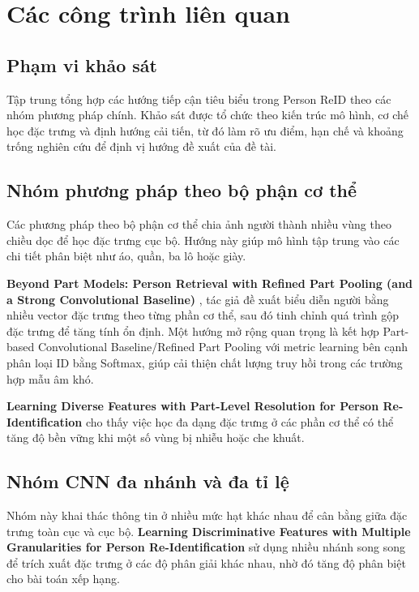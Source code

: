 \section{Các công trình liên quan}

\subsection{Phạm vi khảo sát}
Tập trung tổng hợp các hướng tiếp cận tiêu biểu trong Person
ReID theo các nhóm phương pháp chính. Khảo sát được tổ chức
theo kiến trúc mô hình, cơ chế học đặc trưng và định hướng cải tiến, từ đó làm
rõ ưu điểm, hạn chế và khoảng trống nghiên cứu để định vị hướng đề xuất của đề
tài.

\subsection{Nhóm phương pháp theo bộ phận cơ thể}
Các phương pháp theo bộ phận cơ thể chia ảnh người thành nhiều vùng theo chiều
dọc để học đặc trưng cục bộ. Hướng này giúp mô hình tập trung vào các chi tiết
phân biệt như áo, quần, ba lô hoặc giày.

\textbf{Beyond Part Models: Person Retrieval with Refined Part Pooling
(and a Strong Convolutional Baseline)} \cite{sun2018modelspersonretrievalrefined},
tác giả đề xuất biểu diễn người bằng nhiều vector đặc trưng theo từng phần cơ
thể, sau đó tinh chỉnh quá trình gộp đặc trưng để tăng tính ổn định. Một hướng
mở rộng quan trọng là kết hợp Part-based Convolutional Baseline/Refined Part
Pooling với metric learning bên cạnh phân loại ID bằng Softmax, giúp cải thiện
chất lượng truy hồi trong các trường hợp mẫu âm khó.

\textbf{Learning Diverse Features with Part-Level Resolution for
Person Re-Identification} \cite{xie2020learningdiversefeaturespartlevel} cho
thấy việc học đa dạng đặc trưng ở các phần cơ thể có thể tăng độ bền vững khi
một số vùng bị nhiễu hoặc che khuất.

\subsection{Nhóm CNN đa nhánh và đa tỉ lệ}
Nhóm này khai thác thông tin ở nhiều mức hạt khác nhau để cân bằng giữa đặc
trưng toàn cục và cục bộ.
\textbf{Learning Discriminative Features with
Multiple Granularities for Person Re-Identification} \cite{Wang_2018} sử dụng
nhiều nhánh song song để trích xuất đặc trưng ở các độ phân giải khác nhau, nhờ
đó tăng độ phân biệt cho bài toán xếp hạng.

